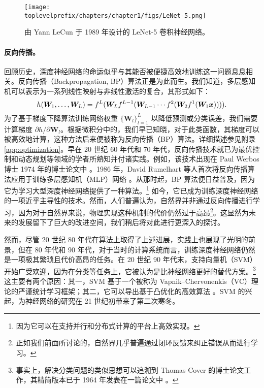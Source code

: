 \documentclass[../../book-main_zh.tex]{subfiles}
\begin{document}
\begin{figure}
    \centering
\texttt{[image: \\toplevelprefix/chapters/chapter1/figs/LeNet-5.png]}
    \caption{由 Yann LeCun 于 1989 年设计的 LeNet-5 卷积神经网络。}
    \label{fig:LeNet-5}
\end{figure}

\paragraph{反向传播。}
回顾历史，深度神经网络的命运似乎与其能否被便捷高效地训练这一问题息息相关。反向传播（Backpropagation, BP）算法正是为此而生。我们知道，多层感知机可以表示为一系列线性映射与非线性激活的复合，其形式如下：
\begin{equation}
h(\bm W_1, \ldots, \bm W_L) = f^L(\bm W_Lf^{L-1}(\bm W_{L-1} \cdots f^2(\bm W_2f^1(\bm W_1\bm{x})))).
\end{equation}
为了基于梯度下降算法训练网络权重 $\{\bm W_l\}_{l=1}^L$ 以降低预测或分类误差，我们需要计算梯度 ${\partial h}/{\partial \bm W_l}$。根据微积分中的{}，我们早已知晓，对于此类函数，其梯度可以被高效地计算，这种方法后来便被称为反向传播（BP）算法。详细描述参见附录 \ref{app:optimization}。早在 20 世纪 60 年代和 70 年代，反向传播技术就已为最优控制和动态规划等领域的学者所熟知并付诸实践。例如，该技术出现在 Paul Werbos 博士 1974 年的博士论文中 \cite{Werbos-1974, Werbos1994TheRO}。1986 年，David Rumelhart 等人首次将反向传播算法应用于训练多层感知机（MLP）网络 \cite{Rumelhart1986}。从那时起，BP 算法便日益普及，因为它为学习大型深度神经网络提供了一种{}算法。\footnote{因为它可以在支持并行和分布式计算的平台上高效实现。} 如今，它已成为训练深度神经网络的一项近乎主导性的技术。然而，人们普遍认为，自然界并非通过反向传播进行学习，因为对于自然界来说，物理实现这种机制的代价仍然过于高昂\footnote{正如我们前面所讨论的，自然界几乎普遍通过闭环反馈来纠正错误从而进行学习。}。这显然为未来的发展留下了巨大的改进空间，我们稍后将对此进行更深入的探讨。

然而，尽管 20 世纪 80 年代在算法上取得了上述进展，实践上也展现了光明的前景，但在 80 年代和 90 年代，对于当时的计算系统而言，训练深度神经网络仍然是一项极其繁琐且代价高昂的任务。在 20 世纪 90 年代末，支持向量机（SVM）\cite{SVM-1995} 开始广受欢迎，因为在分类等任务上，它被认为是比神经网络更好的替代方案。\footnote{事实上，解决分类问题的类似思想可以追溯到 Thomas Cover 的博士论文工作，其精简版本已于 1964 年发表在一篇论文中 \cite{Cover-1964}。} 这主要有两个原因：其一，SVM 基于一个被称为 Vapnik–Chervonenkis（VC）理论的严谨统计学习框架；其二，它可以导出基于凸优化的高效算法 \cite{BoydVa04}。SVM 的兴起，为神经网络的研究在 21 世纪初带来了第二次寒冬。
\end{document}
